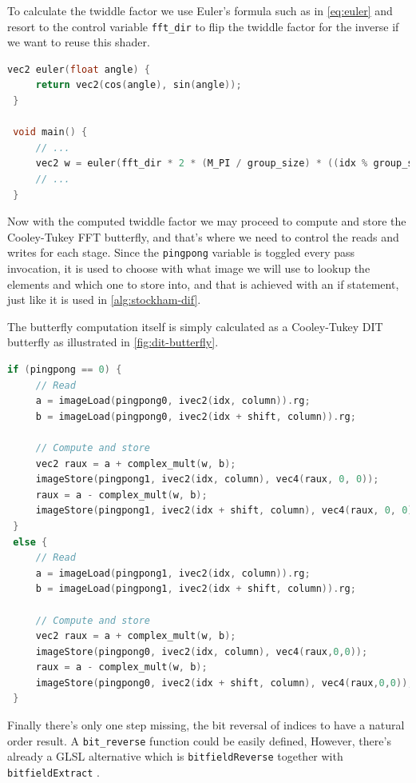 \documentclass[
  oneside,
  11pt, a4paper,
  footinclude=true,
  headinclude=true,
  cleardoublepage=empty
]{scrbook}
\begin{document}
To calculate the twiddle factor we use Euler's formula such as in \autoref{eq:euler} and resort to the control variable \texttt{fft\_dir} to flip the twiddle factor for the inverse if we want to reuse this shader.

\begin{lstlisting}[language=C,label={Euler's formula}]
 vec2 euler(float angle) {
     return vec2(cos(angle), sin(angle));
 }
 
 void main() {
     // ...
     vec2 w = euler(fft_dir * 2 * (M_PI / group_size) * ((idx % group_size) % shift));
     // ...
 }
\end{lstlisting}

Now with the computed twiddle factor we may proceed to compute and store the Cooley-Tukey FFT butterfly, and that's where we need to control the reads and writes for each stage. Since the \texttt{pingpong} variable is toggled every pass invocation, it is used to choose with what image we will use to lookup the elements and which one to store into, and that is achieved with an if statement, just like it is used in \autoref{alg:stockham-dif}.

The butterfly computation itself is simply calculated as a Cooley-Tukey DIT butterfly as illustrated in \autoref{fig:dit-butterfly}.

\begin{lstlisting}[language=C,label={Computation of the Cooley-Tukey butterfly}]
 if (pingpong == 0) {
     // Read
     a = imageLoad(pingpong0, ivec2(idx, column)).rg;
     b = imageLoad(pingpong0, ivec2(idx + shift, column)).rg;

     // Compute and store
     vec2 raux = a + complex_mult(w, b);
     imageStore(pingpong1, ivec2(idx, column), vec4(raux, 0, 0));
     raux = a - complex_mult(w, b);
     imageStore(pingpong1, ivec2(idx + shift, column), vec4(raux, 0, 0));
 }
 else {
     // Read
     a = imageLoad(pingpong1, ivec2(idx, column)).rg;
     b = imageLoad(pingpong1, ivec2(idx + shift, column)).rg;
     
     // Compute and store
     vec2 raux = a + complex_mult(w, b);
     imageStore(pingpong0, ivec2(idx, column), vec4(raux,0,0));    
     raux = a - complex_mult(w, b);
     imageStore(pingpong0, ivec2(idx + shift, column), vec4(raux,0,0));
 }
\end{lstlisting}

Finally there's only one step missing, the bit reversal of indices to have a natural order result. A \texttt{bit\_reverse} function could be easily defined, However, there's already a GLSL alternative which is \texttt{bitfieldReverse} together with \texttt{bitfieldExtract} \cite{kessenich4opengl}.
\end{document}
